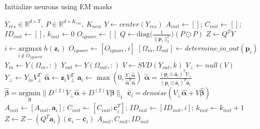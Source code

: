 \documentclass[10pt,letterpaper]{article}
\begin{document}
{\begin{algorithm}[t!]
\caption{Initialize neurons using EM masks}
\label{alg:initialization}
\begin{algorithmic}[1]
\Require $Y_{res}\in \mathbb{R}^{d\times T}, ~P\in \mathbb{R}^{d\times K_{em}}, ~K_{new} $ 
\State $Y\leftarrow center(Y_{res})$ 
\State $A_{init} \leftarrow []$; $C_{init} \leftarrow []$; $ID_{init}\leftarrow []$, $k_{init} \leftarrow 0$
\State $O_{ignore} \leftarrow []$  
\State $Q \leftarrow \text{diag}\big(\frac{1}{\|\bm{p}_i\|_3^2}\big)(P\odot P)$
\State $Z\leftarrow Q^TY$ %
	\State $i \leftarrow \underset{i\notin O_{ignored}}{\text{argmax}} ~h(\bm{z}_i)$    
       	\State $O_{ignore} \leftarrow [O_{ignore}, i]$  		
	\State {}
	\State $[\Omega_{in}, \Omega_{out}] \leftarrow determine\_in\_out(\bm{p}_i)$
	\State $Y_{in} \leftarrow Y(\Omega_{in}, :)$ 
	\State $Y_{out} \leftarrow Y(\Omega_{out}, :)$ 
	\State $V \leftarrow SVD(Y_{out}, k)$  
	\State $V_\perp \leftarrow null(V)$  
	\State $Y_\perp \leftarrow Y_{in}V_\perp^T$
	\State $\hat{\bm\alpha} \leftarrow \bm{z}_iV_\perp^T$  
	   
		\State $\bm{a}_i \leftarrow \max(0, \frac{Y_{\perp}\hat{\bm{\alpha}}}{\hat{\bm{\alpha}}^T\hat{\bm{\alpha}}})$
		\State $\hat{\bm{\alpha}} = \frac{(\bm{p}_i\odot\hat{\bm{a}}_i)^TY_\perp}{(\bm{p}_i\odot\hat{\bm{a}}_i)^T\hat{\bm{a}}_i}$  
	\EndFor
	\State 	$\hat{\bm{\beta}} = \underset{\bm\beta} {\text{argmin}}\|D^{(2)}V_\perp\hat{\bm\alpha} + D^{(2)}V\bm\beta \|_1 $ 
	\State $\hat{\bm{c}}_i = denoise(V_\perp\hat{\bm{\alpha}} + V\hat{\bm{\beta}}) $ 
	\State {}
		\State $A_{init} \leftarrow [A_{init}, \bm{a}_i]$; $C_{init} \leftarrow [C_{init}; \bm{c}_i^T]$; $ID_{init} \leftarrow [ID_{init}, i]$; $k_{init} \leftarrow k_{init}+1$
		\State $Z \leftarrow Z - (Q^T\bm{a}_i)(\bm{c}_i-\bar{\bm{c}}_i)$ 
    \Else
	\EndIf
\EndWhile
\State 
\Return $A_{init}, C_{init}, ID_{init}$
\end{algorithmic}
\end{algorithm}

}
\end{document}
